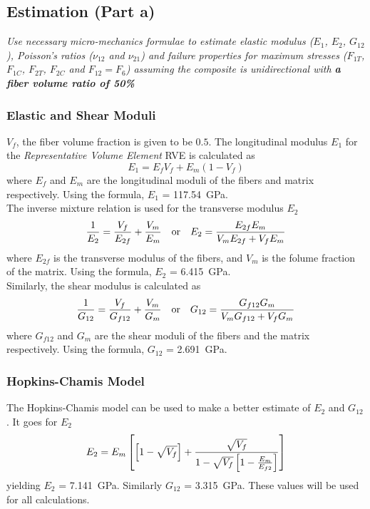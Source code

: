 \documentclass[a4paper,twosided,11pt,DIV14]{scrartcl}
\begin{document}
\subsection{Estimation (Part a)}

\textit{Use necessary micro-mechanics formulae to estimate elastic modulus
  ($E_{1}$, $E_{2}$,
$G_{12}$), Poisson's ratios ($\nu_{12}$ and $\nu_{21}$) and failure properties for maximum stresses
($F_{1T}$, $F_{1C}$, $F_{2T}$, $F_{2C}$ and $F_{12}=F_{6}$) assuming the composite is unidirectional
with \textbf{a fiber volume ratio of 50\%}}
\subsubsection{Elastic and Shear Moduli}
%
$V_f$, the fiber volume fraction  is given to be $0.5$. The longitudinal
modulus $E_1$ for the \emph{Representative Volume Element} RVE is calculated as
%
\begin{equation}
  E_1 = E_fV_f + E_m (1-V_f)
\end{equation}
%
where $E_f$ and $E_m$ are the longitudinal moduli of the fibers and matrix
respectively. Using the formula, $E_1$ = \SI{117.54}{GPa}.
%
\\The inverse mixture relation is used for the transverse modulus $E_2$
%
\begin{equation}
  \frac{1}{E_2} = \frac{V_f}{E_{2f}} + \frac{V_m}{E_m}
  \quad\textup{or}\quad
  E_2 = \frac{E_{2f} E_m}{V_mE_{2f}+V_fE_m}
\end{equation}
%
where $E_{2f}$ is the transverse modulus of the fibers, and $V_m$ is the folume
fraction of the matrix. Using the formula, $E_2$ = \SI{6.415}{GPa}.
\\Similarly, the shear modulus is calculated as
%
\begin{equation}
  \frac{1}{G_{12}} = \frac{V_f}{G_{f12}} + \frac{V_m}{G_m}
  \quad\textup{or}\quad
  G_{12} = \frac{G_{f12} G_m}{V_mG_{f12}+V_fG_m}
\end{equation}
%
where $G_{f12}$ and $G_m$ are the shear moduli of the fibers and the matrix
respectively. Using the formula, $G_{12}$ = \SI{2.691}{GPa}.
%
\subsubsection{Hopkins-Chamis Model}
%
The Hopkins-Chamis model can be used to make a better estimate of $E_2$ and
$G_{12}$. It goes for $E_2$
%
\begin{equation}
  E_{2} = E_m\left[\left[1-\sqrt{V_f}\right]+\frac{\sqrt{V_f}}{1-\sqrt{V_f}\left[1-\frac{E_m}{E_{f2}}\right]}\right]
\end{equation}
%
yielding $E_2$ = \SI{7.141}{GPa}. Similarly $G_{12}$ = \SI{3.315}{GPa}.
%
These values will be used for all calculations.
%
%
\end{document}

